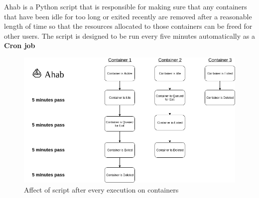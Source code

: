 Ahab is a Python script that is responsible for making sure that any containers that have been idle for too long or exited recently are removed after a reasonable length of time so that the resources allocated to those containers can be freed for other users. The script is designed to be run every five minutes automatically as a \textbf{Cron job}

\begin{figure}[h!]
    \centering
    \includegraphics[width=\linewidth]{res/Ahab.png}
    \caption{Affect of script after every execution on containers}
    \label{fig:ahab-diagram}
\end{figure}

\pagebreak
